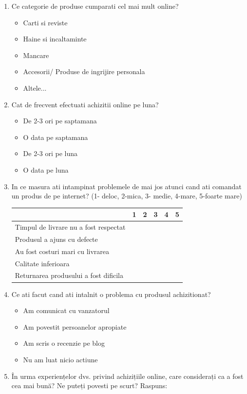 \documentclass[a4paper, 12pt]{article}
\begin{document}
\begin{enumerate}
	\item Ce categorie de produse cumparati cel mai mult online? 
\thispagestyle{empty}
	\begin{itemize}
		\item Carti si reviste
		\item Haine si incaltaminte
		\item Mancare
		\item Accesorii/ Produse de ingrijire personala
		\item Altele...
	\end{itemize}
	\item Cat de frecvent efectuati achizitii online pe luna? 
	\begin{itemize}
		\item De 2-3 ori pe saptamana
		\item O data pe saptamana
		\item De 2-3 ori pe luna
		\item O data pe luna
	\end{itemize}
	\item In ce masura ati intampinat problemele de mai jos atunci cand ati comandat un produs de pe internet? (1- deloc, 2-mica, 3- medie, 4-mare, 5-foarte mare)
	\begin{center}
		\begin{tabular}{ | m{19em} | m{1cm}| m{1cm} | m{1cm}| m{1cm} | m{1cm} |} 
			\hline
			& 1 & 2 & 3 & 4 & 5\\ 
			\hline
			Timpul de livrare nu a fost respectat  &  &  &  & & \\ 
			\hline
			Produsul a ajuns cu defecte &  &   &  &  &\\ 
			\hline
			Au fost costuri mari cu livrarea &  &   &  & & \\ 
			\hline
			Calitate inferioara&  &  &  & & \\ 
			\hline
			Returnarea produsului a fost dificila &  &  &  & & \\
			\hline
		\end{tabular}
	\end{center}
	\item Ce ati facut cand ati intalnit o problema cu produsul achizitionat?
	\begin{itemize}
		\item Am comunicat cu vanzatorul
		\item Am povestit persoanelor apropiate
		\item Am scris o recenzie pe blog
		\item Nu am luat nicio actiune
	\end{itemize}
\thispagestyle{empty}
	\item În urma experiențelor dvs.  privind achizițiile online, care considerați ca a fost cea mai bună? Ne puteți povesti pe scurt?
	\newline Raspuns: 


\end{enumerate}
\end{document}
